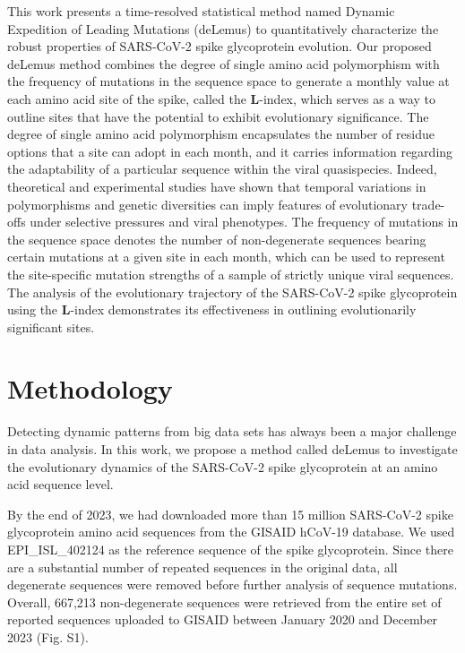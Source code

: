 \documentclass[aps,prl,amsmath,amssymb,floatfix,twocolumn, amsmath, superscriptaddress, onecolumn]{revtex4}
\begin{document}
This work presents a time-resolved statistical method named Dynamic Expedition of Leading Mutations (deLemus) to quantitatively characterize the robust properties of SARS-CoV-2 spike glycoprotein evolution. Our proposed deLemus method combines the degree of single amino acid polymorphism with the frequency of mutations in the sequence space to generate a monthly value at each amino acid site of the spike, called the $\bm{L}$-index, which serves as a way to outline sites that have the potential to exhibit evolutionary significance. The degree of single amino acid polymorphism encapsulates the number of residue options that a site can adopt in each month, and it carries information regarding the adaptability of a particular sequence within the viral quasispecies.\cite{10.1128/mmbr.05023-11, 10.1371/journal.ppat.1001005, 10.1098/rsbl.2015.0315} Indeed, theoretical and experimental studies have shown that temporal variations in polymorphisms and genetic diversities can imply features of evolutionary trade-offs under selective pressures and viral phenotypes.\cite{10.1371/journal.ppat.1000242, 10.1371/journal.pone.0052752, 10.1098/rstb.2017.0105, 10.1080/21505594.2021.1911477} The frequency of mutations in the sequence space denotes the number of non-degenerate sequences bearing certain mutations at a given site in each month, which can be used to represent the site-specific mutation strengths of a sample of strictly unique viral sequences. The analysis of the evolutionary trajectory of the SARS-CoV-2 spike glycoprotein using the $\bm{L}$-index demonstrates its effectiveness in outlining evolutionarily significant sites.

\section{Methodology}

Detecting dynamic patterns from big data sets has always been a major challenge in data analysis. In this work, we propose a method called deLemus to investigate the evolutionary dynamics of the SARS-CoV-2 spike glycoprotein at an amino acid sequence level.

By the end of 2023, we had downloaded more than 15 million SARS-CoV-2 spike glycoprotein amino acid sequences from the GISAID hCoV-19 database.\cite{gisaid} We used EPI\_ISL\_402124 as the reference sequence of the spike glycoprotein.\cite{Zhou2020,Wu2020} Since there are a substantial number of repeated sequences in the original data, all degenerate sequences were removed before further analysis of sequence mutations. Overall, 667,213 non-degenerate sequences were retrieved from the entire set of reported sequences uploaded to GISAID between January 2020 and December 2023 (Fig. S1).
\end{document}
